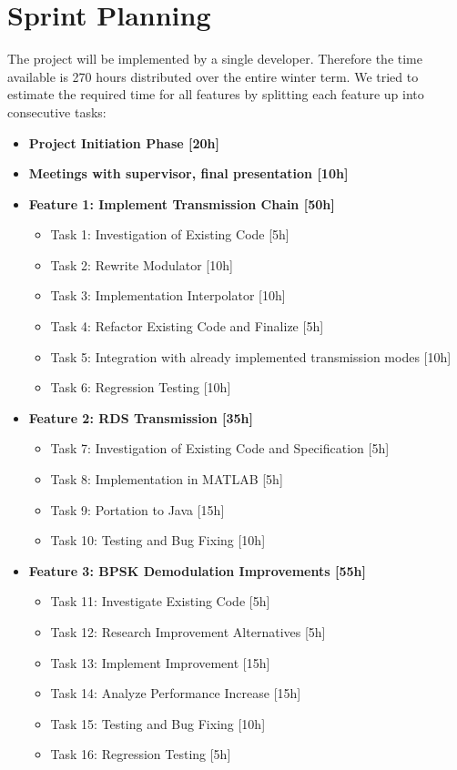 \section{Sprint Planning}
The project will be implemented by a single developer. Therefore the time available is 270 hours distributed over the entire winter term. We tried to estimate the required time for all features by splitting each feature up into consecutive tasks:
\begin{itemize}
\item \textbf{Project Initiation Phase [20h]}
\item \textbf{Meetings with supervisor, final presentation [10h]}
\item \textbf{Feature 1: Implement Transmission Chain [50h]}
\begin{itemize}
\item Task 1: Investigation of Existing Code [5h] 
\item Task 2: Rewrite Modulator [10h]
\item Task 3: Implementation Interpolator [10h]
\item Task 4: Refactor Existing Code and Finalize [5h]
\item Task 5: Integration with already implemented transmission modes [10h]
\item Task 6: Regression Testing [10h]
\end{itemize}
\item \textbf{Feature 2: \ac{RDS} Transmission [35h]}
\begin{itemize}
\item Task 7: Investigation of Existing Code and Specification [5h]
\item Task 8: Implementation in MATLAB [5h]
\item Task 9: Portation to Java [15h]
\item Task 10: Testing and Bug Fixing [10h]
\end{itemize}
\item \textbf{Feature 3: \ac{BPSK} Demodulation Improvements [55h]}
\begin{itemize}
\item Task 11: Investigate Existing Code [5h]
\item Task 12: Research Improvement Alternatives [5h]
\item Task 13: Implement Improvement [15h]
\item Task 14: Analyze Performance Increase [15h]
\item Task 15: Testing and Bug Fixing [10h]
\item Task 16: Regression Testing [5h]

\end{itemize}
\end{itemize}
